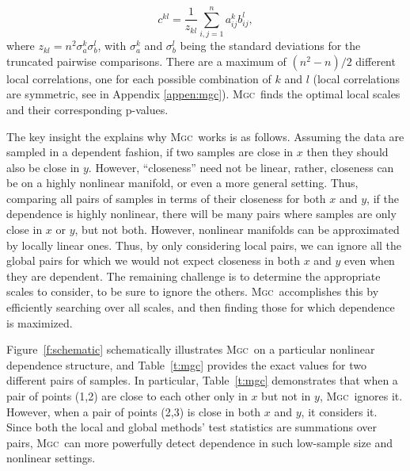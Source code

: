 \documentclass[11pt]{article}
\providecommand{\sct}[1]{{\normalfont\textsc{#1}}}
\newcommand{\G}{c}
\newcommand{\Mgc}{\sct{Mgc}}
\begin{document}
\begin{equation}
\label{localCoef}
\G^{kl}=\dfrac{1}{z_{kl}} {\textstyle \sum_{i,j=1}^n a_{ij}^k b_{ij}^l},
\end{equation}
where $z_{kl}=n^2 \sigma_a^k \sigma_b^l$,  with $\sigma_a^k$ and $\sigma_b^{l}$ being the standard deviations for the truncated pairwise comparisons. There are a maximum of $(n^2-n)/2$ different local correlations, one for each possible combination of $k$ and $l$ (local correlations are symmetric, see in Appendix \ref{appen:mgc}).
\Mgc~finds the optimal local scales and their corresponding p-values.




The key insight the explains why \Mgc~works is as follows.  
Assuming the data are sampled in a dependent fashion,  if two samples are close in $x$ then they should also be close in $y$.  However, ``closeness'' need not be linear, rather, closeness can be on a highly nonlinear manifold, or even a more general setting.  Thus,  comparing all pairs of samples in terms of their closeness for both $x$ and $y$, if the dependence is highly nonlinear, there will be many pairs where samples are only close in $x$ or $y$, but not both.  
However, nonlinear manifolds can be approximated by locally linear ones.  
Thus, by only considering local pairs, we can ignore all the global pairs for which we would not expect closeness in both $x$ and $y$ even when they are dependent.  
The remaining challenge is to determine the appropriate scales to consider, to be sure to ignore the others.  \Mgc~accomplishes this by efficiently searching over all scales, and then finding those for which dependence is maximized.  



Figure~\ref{f:schematic} schematically illustrates \Mgc~on a particular nonlinear dependence structure, and Table~\ref{t:mgc} provides the exact values for two different pairs of samples.  In particular, Table~\ref{t:mgc} demonstrates that when a pair of points (1,2) are close to each other only in $x$ but not in $y$, \Mgc~ignores it.  However, when a pair of points (2,3) is close in both $x$ and $y$, it considers it.  Since both the local and global methods' test statistics are summations over pairs,  \Mgc~can more powerfully detect dependence in such low-sample size and nonlinear settings.
\end{document}
